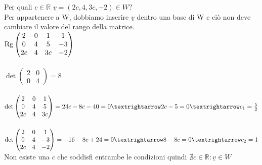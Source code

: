 	\begin{esercizio}
		Per quali $c\in\mathbb{R}$ $\underline{v}=(2c,4,3c,-2)\in W?$
		\leavevmode\\
		Per appartenere a W, dobbiamo inserire $\underline{v}$ dentro una base di W e ciò non deve cambiare il valore del rango della matrice.
		\leavevmode\\
		$
		\textnormal{Rg}\begin{pmatrix}
			2 & 0 & 1 & 1\\
			0 & 4 & 5 & -3\\
			2c & 4 & 3c & -2
		\end{pmatrix}
		$
		\leavevmode\\\\
		$
		\det\begin{pmatrix}
			2 & 0\\
			0 & 4
		\end{pmatrix}=8
		$
		\leavevmode\\\\
		$
		\det\begin{pmatrix}
			2 & 0 & 1\\
			0 & 4 & 5\\
			2c & 4 & 3c
		\end{pmatrix}=24c-8c-40=0\textrightarrow2c-5=0\textrightarrow c_1=\frac{5}{2}
		$
		\leavevmode\\\\
		$
		\det\begin{pmatrix}
			2 & 0 & 1\\
			0 & 4 & -3\\
			2c & 4 & -2
		\end{pmatrix}=-16-8c+24=0\textrightarrow8-8c=0\textrightarrow c_2=1
		$
		\leavevmode\\
		Non esiste una $c$ che soddisfi entrambe le condizioni quindi $\nexists c\in \mathbb{R}:\underline{v}\in W$
	\end{esercizio}
	
